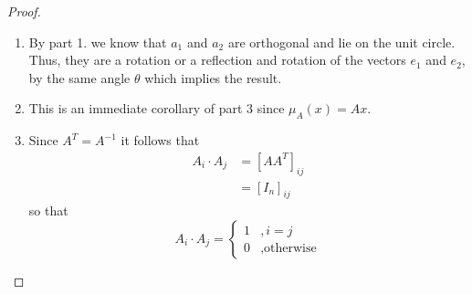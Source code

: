 \begin{exercise}
\begin{proof}
\begin{enumerate}
            \item By part 1. we know that \( a_1 \) and \( a_2 \) are orthogonal and lie on the unit circle. Thus, they are a rotation or a reflection and rotation of the vectors \( e_1 \) and \( e_2 \), by the same angle \( \theta \) which implies the result.
            
            \begin{center}
            \end{center}
            
            \item This is an immediate corollary of part 3 since \( \mu_A(x) = Ax \).
            
            \item Since \( A^T = A^{-1} \) it follows that
            \begin{align*}
                A_i \cdot A_j &= \left[ AA^T \right]_{ij} \\
                &= [I_n]_{ij}
            \end{align*}
            so that
            \[
            A_i \cdot A_j = 
            \begin{cases}
                1 &, i=j \\
                0 &, \text{otherwise}
            \end{cases}
            \]
        \end{enumerate}
    \end{proof}
\end{exercise} %

